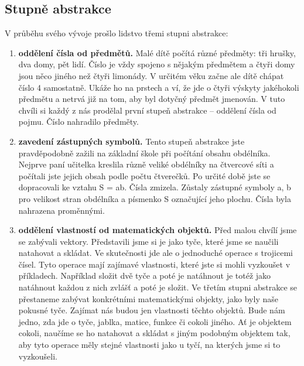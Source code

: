     \subsection{Stupně abstrakce}
      V průběhu svého vývoje prošlo lidstvo třemi stupni abstrakce:
      \begin{enumerate}[leftmargin=1cm,rightmargin=.1cm, label=\emph{\alph*}),noitemsep]
        \item \textbf{oddělení čísla od předmětů.} Malé dítě počítá různé předměty: tři hrušky, dva
              domy, pět lidí. Číslo je vždy spojeno s nějakým předmětem a čtyři domy jsou něco
              jiného než čtyři limonády. V určitém věku začne ale dítě chápat číslo 4 samostatně.
              Ukáže ho na prstech a ví, že jde o čtyři výskyty jakéhokoli předmětu a netrvá již na
              tom, aby byl dotyčný předmět jmenován. V tuto chvíli si každý z nás prodělal první
              stupeň abstrakce – oddělení čísla od pojmu. Číslo nahradilo předměty.
        \item \textbf{zavedení zástupných symbolů.} Tento stupeň abstrakce jste pravděpodobně zažili
              na základní škole při počítání obsahu obdélníka. Nejprve paní učitelka kreslila různě
              veliké obdélníky na čtvercové síti a počítali jste jejich obsah podle počtu čtverečků.
              Po určité době jste se dopracovali ke vztahu S = ab. Čísla zmizela. Zůstaly zástupné
              symboly a, b pro velikost stran obdélníka a písmenko S označující jeho plochu. Čísla
              byla nahrazena proměnnými.
        \item \textbf{oddělení vlastností od matematických objektů.} Před malou chvílí jsme se
              zabývali vektory. Představili jsme si je jako tyče, které jsme se naučili natahovat a
              skládat. Ve skutečnosti jde ale o jednoduché operace s trojicemi čísel. Tyto operace
              mají zajímavé vlastnosti, které jste si mohli vyzkoušet v příkladech. Například
              složit dvě tyče a poté je natáhnout je totéž jako natáhnout každou z nich zvlášť a
              poté je složit. Ve třetím stupni abstrakce se přestaneme zabývat konkrétními
              matematickými objekty, jako byly naše pokusné tyče. Zajímat nás budou jen vlastnosti
              těchto objektů. Bude nám jedno, zda jde o tyče, jablka, matice, funkce či cokoli
              jiného. Ať je objektem cokoli, naučíme se ho natahovat a skládat s jiným podobným
              objektem tak, aby tyto operace měly stejné vlastnosti jako u tyčí, na kterých jsme si
              to vyzkoušeli.
      \end{enumerate} 

